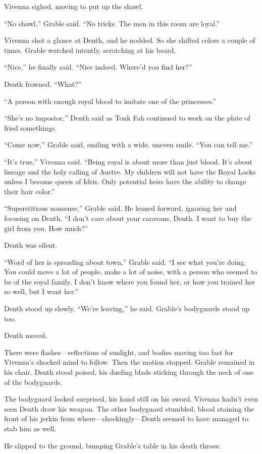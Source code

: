 Vivenna sighed, moving to put up the shawl.

“No shawl,” Grable said. “No tricks. The men in this room are loyal.”

Vivenna shot a glance at Denth, and he nodded. So she shifted colors a couple of times. Grable watched intently, scratching at his beard.

“Nice,” he finally said. “Nice indeed. Where’d you find her?”

Denth frowned. “What?”

“A person with enough royal blood to imitate one of the princesses.”

“She’s no impostor,” Denth said as Tonk Fah continued to work on the plate of fried somethings.

“Come now,” Grable said, smiling with a wide, uneven smile. “You can tell me.”

“It’s true,” Vivenna said. “Being royal is about more than just blood. It’s about lineage and the holy calling of Austre. My children will not have the Royal Locks unless I become queen of Idris. Only potential heirs have the ability to change their hair color.”

“Superstitious nonsense,” Grable said. He leaned forward, ignoring her and focusing on Denth. “I don’t care about your caravans, Denth. I want to buy the girl from you. How much?”

Denth was silent.

“Word of her is spreading about town,” Grable said. “I see what you’re doing. You could move a lot of people, make a lot of noise, with a person who seemed to be of the royal family. I don’t know where you found her, or how you trained her so well, but I want her.”

Denth stood up slowly. “We’re leaving,” he said. Grable’s bodyguards stood up too.

Denth moved.

There were flashes—reflections of sunlight, and bodies moving too fast for Vivenna’s shocked mind to follow. Then the motion stopped. Grable remained in his chair. Denth stood poised, his dueling blade sticking through the neck of one of the bodyguards.

The bodyguard looked surprised, his hand still on his sword. Vivenna hadn’t even seen Denth draw his weapon. The other bodyguard stumbled, blood staining the front of his jerkin from where—shockingly—Denth seemed to have managed to stab him as well.

He slipped to the ground, bumping Grable’s table in his death throes.

